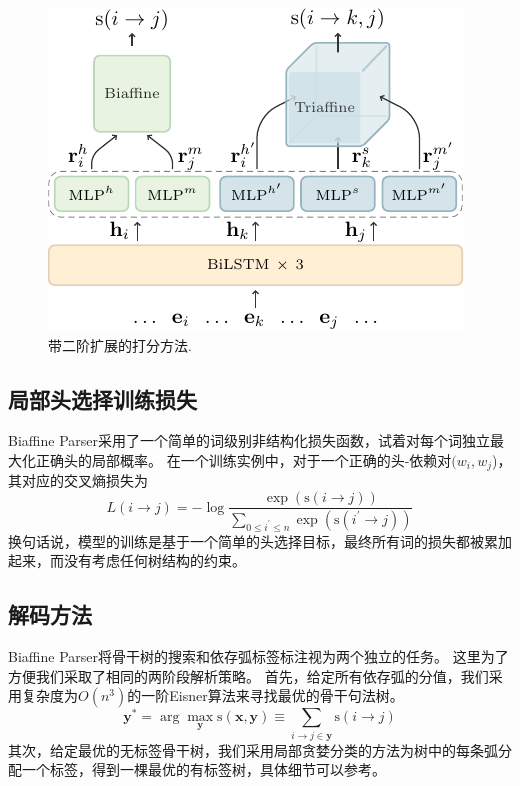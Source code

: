 \begin{figure}[tb]
	\centering
	\includegraphics[scale=1.5]{figures/dep-framework.pdf}
	\caption{带二阶扩展的打分方法.}
	\label{fig:dep-framework}
\end{figure}

\subsection{局部头选择训练损失}
Biaffine Parser采用了一个简单的词级别非结构化损失函数，试着对每个词独立最大化正确头的局部概率。
在一个训练实例中，对于一个正确的头-依赖对$(w_i, w_j$)，其对应的交叉熵损失为
\begin{equation} \label{eq:biaffine-loss}
	\mathit{L}(i\rightarrow j) = -\log{\frac{\exp(\mathrm{s}(i\rightarrow j))}{\sum_{0 \le i^{\prime} \le n} \exp(\mathrm{s}(i^{\prime}\rightarrow j))}}
\end{equation}
换句话说，模型的训练是基于一个简单的头选择目标，最终所有词的损失都被累加起来，而没有考虑任何树结构的约束。

\subsection{解码方法}
Biaffine Parser将骨干树的搜索和依存弧标签标注视为两个独立的任务。
这里为了方便我们采取了相同的两阶段解析策略。
首先，给定所有依存弧的分值，我们采用复杂度为$O(n^3)$的一阶Eisner算法来寻找最优的骨干句法树。
\begin{equation}
	\label{eq:map-decoding}
	{\boldsymbol{y}}^* = \arg\max_{\boldsymbol{y}} \mathrm{s}(\boldsymbol{x},\boldsymbol{y}) \equiv
	\sum_{i \rightarrow j \in \boldsymbol{y}}{\mathrm{s}(i\rightarrow j)}
\end{equation}
其次，给定最优的无标签骨干树，我们采用局部贪婪分类的方法为树中的每条弧分配一个标签，得到一棵最优的有标签树，具体细节可以参考\citet{dozat-etal-2017-biaffine}。

